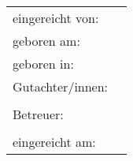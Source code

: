 {\begin{titlepage}
		\vfill
{}
		{\large \raggedleft
			\begin{tabularx}{\textwidth}{l@{\,\,\raggedright~}L} %
				eingereicht von: & \@titelAutor\\
				geboren am: & {\@titelGeburtsdatum}\\
				geboren in: & \@titelGeburtsort
				\vspace{0.5\baselineskip}\\
				Gutachter/innen: & \@titelGutachterA \\
					& \@titelGutachterB
				\vspace{0.5\baselineskip}\\
				Betreuer:  & \@titelBetreuer \\
				\vspace{0.5\baselineskip}\\
				eingereicht am: & \@titelEinreichungsdatum \hfill \@titelVerteidigungsdatum
			\end{tabularx}}
			\vspace{-1\baselineskip}\\\phantom{x} %
		\setlength{\parindent}{\parindentbak}
		\setlength{\parskip}{\parskipbak}
	\end{titlepage}

	\let\@titelTitel\undefined
	\let\titel\undefined
	\let\@titelArbeit\undefined
	\let\typ\undefined
	\let\@titelGrad\undefined
	\let\grad\undefined
	\let\@titelAutor\undefined
	\let\autor\undefined
	\let\@titelGeburtsdatum\undefined
	\let\gebdatum\undefined
	\let\@titelGeburtsort\undefined
	\let\gebort\undefined
	\let\@titelGutachterA\undefined
	\let\@titelGutachterB\undefined
	\let\gutachter\undefined
	\let\@titelEinreichungsdatum\undefined
	\let\einreichungsdatum\undefined
	\let\@titelVerteidigungsdatum\undefined
	\let\verteidigungsdatum\undefined

	\KOMAoptions{\@wastwoside}%
	\let\@wastwoside\undefined
	\cleardoublepage %
}

